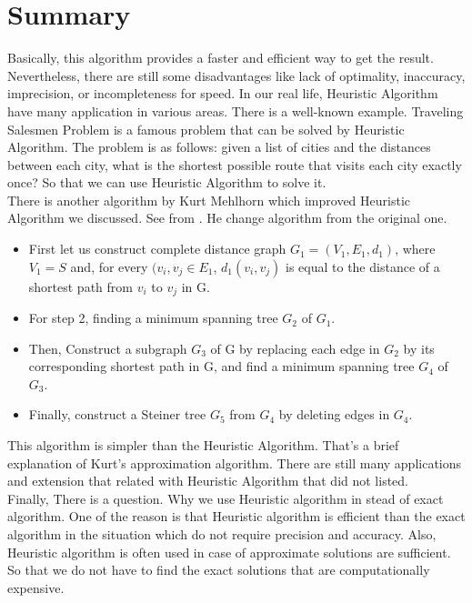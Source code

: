 \documentclass[letterpaper,11pt,twocolumn]{article}
\begin{document}
\section{Summary}
Basically, this algorithm provides a faster and efficient way to get the result. Nevertheless, there are still some disadvantages like lack of optimality, inaccuracy, imprecision, or incompleteness for speed. In our real life, Heuristic Algorithm have many application in various areas. There is a well-known example. Traveling Salesmen Problem is a famous problem that can be solved by Heuristic Algorithm. The problem is as follows: given a list of cities and the distances between each city, what is the shortest possible route that visits each city exactly once? \cite{Salesman} So that we can use Heuristic Algorithm to solve it.\\
There is another algorithm by Kurt Mehlhorn which improved Heuristic Algorithm we discussed. See from \cite{approxi}. He change algorithm from the original one. \\ 
\begin{itemize} 
    \item First let us construct complete distance graph $G_1 = (V_1,E_1,d_1)$, where $V_1 = S$ and, for every $(v_i, v_j \in E_1$, $d_1(v_i,v_j)$ is equal to the distance of a shortest path from $v_i$ to $v_j$ in G. 
    \item For step 2, finding  a minimum spanning tree $G_2$ of $G_1$. 
    \item Then, Construct a subgraph $G_3$ of G by replacing each edge in $G_2$ by its corresponding shortest path in G, and find a minimum spanning tree $G_4$ of $G_3$. 
    \item Finally, construct a Steiner tree $G_5$ from $G_4$ by deleting edges in $G_4$. 
\end{itemize}    
This algorithm is simpler than the Heuristic Algorithm. That's a brief explanation of Kurt's approximation algorithm. There are still many applications and extension that related with Heuristic Algorithm that did not listed. \\
Finally, There is a question. Why we use Heuristic algorithm in stead of exact algorithm. One of the reason is that Heuristic algorithm is efficient than the exact algorithm in the situation which do not require precision and accuracy. Also, Heuristic algorithm is often used in case of approximate solutions are sufficient. So that we do not have to find the exact solutions that are computationally expensive.
\end{document}
